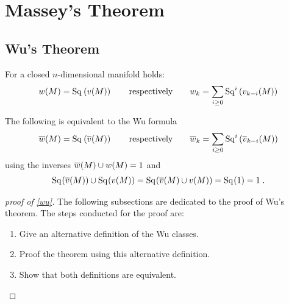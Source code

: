 % 

\chapter{Massey's Theorem}

\section{Wu's Theorem}
\begin{Thm}[Wu]\label{wu}
  For a closed $n$-dimensional manifold holds:
  \begin{gather*}
    w(M) = \mathrm{Sq}^{}\left(v(M)\right)
    \qquad\text{respectively}\qquad
    w_k = \sum_{i\geq0} \mathrm{Sq}^{i}\left(v_{k-i}(M)\right)
  \end{gather*}
\end{Thm}
\begin{Rem}
  The following is equivalent to the Wu formula
  \begin{gather*}
    \overline{w}(M) = \mathrm{Sq}^{}\left(\overline{v}(M)\right)
    \qquad\text{respectively}\qquad
    \overline{w}_k = \sum_{i\geq0} \mathrm{Sq}^{i}\left(\overline{v}_{k-i}(M)\right)
  \end{gather*}
  using the inverses $\overline{w}(M)\cup w(M) = 1$ and
  \begin{gather*}
    \mathrm{Sq}^{}(\overline{v}(M))\cup\mathrm{Sq}^{}(v(M))
    = \mathrm{Sq}^{}(\overline{v}(M)\cup v(M))
    = \mathrm{Sq}^{}(1)
    = 1
    \;.
  \end{gather*}
\end{Rem}
\begin{proof}[proof of \autoref{wu}]
  The following subsections are dedicated to the proof of
  Wu's theorem. The steps conducted for the proof
  are:
  \begin{enumerate} %
  \item Give an alternative definition of the Wu classes.
  \item Proof the theorem using this alternative definition.
  \item Show that both definitions are equivalent.
  \end{enumerate}
\end{proof}






